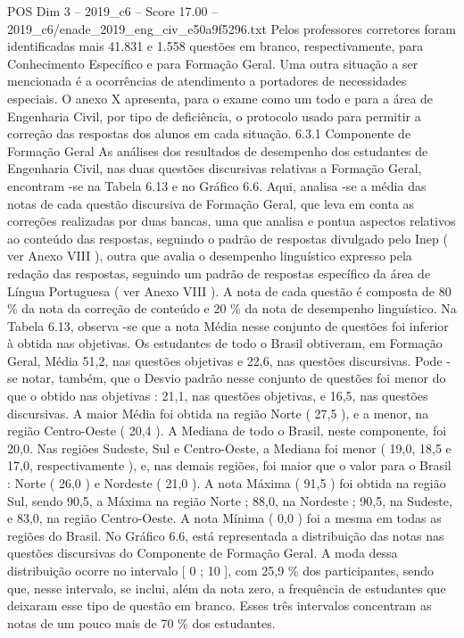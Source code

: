 \begin{textsample}{POS Dim 3 – 2019\_c6 – Score 17.00 – 2019\_c6/enade\_2019\_eng\_civ\_e50a9f5296.txt}
Pelos professores corretores foram identificadas mais 41.831 e 1.558 questões em branco, respectivamente, para Conhecimento Específico e para Formação Geral.
Uma outra situação a ser mencionada é a ocorrências de atendimento a portadores de necessidades especiais.
O anexo X apresenta, para o exame como um todo e para a área de Engenharia Civil, por tipo de deficiência, o protocolo usado para permitir a correção das respostas dos alunos em cada situação. 6.3.1 Componente de Formação Geral As análises dos resultados de desempenho dos estudantes de Engenharia Civil, nas duas questões discursivas relativas a Formação Geral, encontram -se na Tabela 6.13 e no Gráfico 6.6.
Aqui, analisa -se a média das notas de cada questão discursiva de Formação Geral, que leva em conta as correções realizadas por duas bancas, uma que analisa e pontua aspectos relativos ao conteúdo das respostas, seguindo o padrão de respostas divulgado pelo Inep ( ver Anexo VIII ), outra que avalia o desempenho linguístico expresso pela redação das respostas, seguindo um padrão de respostas específico da área de Língua Portuguesa ( ver Anexo VIII ).
A nota de cada questão é composta de 80 \% da nota da correção de conteúdo e 20 \% da nota de desempenho linguístico.
Na Tabela 6.13, observa -se que a nota Média nesse conjunto de questões foi inferior à obtida nas objetivas.
Os estudantes de todo o Brasil obtiveram, em Formação Geral, Média 51,2, nas questões objetivas e 22,6, nas questões discursivas.
Pode -se notar, também, que o Desvio padrão nesse conjunto de questões foi menor do que o obtido nas objetivas : 21,1, nas questões objetivas, e 16,5, nas questões discursivas.
A maior Média foi obtida na região Norte ( 27,5 ), e a menor, na região Centro-Oeste ( 20,4 ).
A Mediana de todo o Brasil, neste componente, foi 20,0.
Nas regiões Sudeste, Sul e Centro-Oeste, a Mediana foi menor ( 19,0, 18,5 e 17,0, respectivamente ), e, nas demais regiões, foi maior que o valor para o Brasil : Norte ( 26,0 ) e Nordeste ( 21,0 ).
A nota Máxima ( 91,5 ) foi obtida na região Sul, sendo 90,5, a Máxima na região Norte ; 88,0, na Nordeste ; 90,5, na Sudeste, e 83,0, na região Centro-Oeste.
A nota Mínima ( 0,0 ) foi a mesma em todas as regiões do Brasil.
No Gráfico 6.6, está representada a distribuição das notas nas questões discursivas do Componente de Formação Geral.
A moda dessa distribuição ocorre no intervalo [ 0 ; 10 ], com 25,9 \% dos participantes, sendo que, nesse intervalo, se inclui, além da nota zero, a frequência de estudantes que deixaram esse tipo de questão em branco.
Esses três intervalos concentram as notas de um pouco mais de 70 \% dos estudantes.

\end{textsample}
